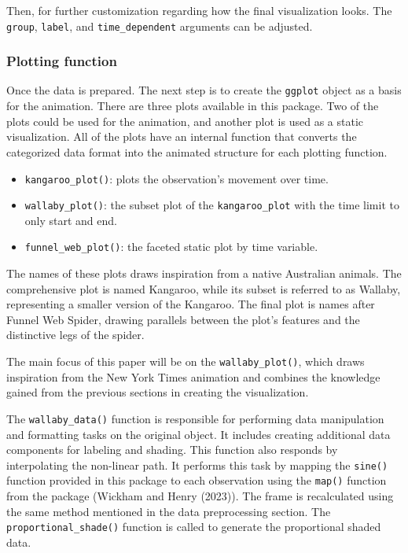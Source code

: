 Then, for further customization regarding how the final visualization looks. The \texttt{group}, \texttt{label}, and \texttt{time\_dependent} arguments can be adjusted.

\hypertarget{plotting-function}{%
\subsubsection{Plotting function}\label{plotting-function}}

Once the data is prepared. The next step is to create the \texttt{ggplot} object as a basis for the animation. There are three plots available in this package. Two of the plots could be used for the animation, and another plot is used as a static visualization. All of the plots have an internal function that converts the categorized data format into the animated structure for each plotting function.

\begin{itemize}
\tightlist
\item
  \texttt{kangaroo\_plot()}: plots the observation's movement over time.
\item
  \texttt{wallaby\_plot()}: the subset plot of the \texttt{kangaroo\_plot} with the time limit to only start and end.
\item
  \texttt{funnel\_web\_plot()}: the faceted static plot by time variable.
\end{itemize}

The names of these plots draws inspiration from a native Australian animals. The comprehensive plot is named Kangaroo, while its subset is referred to as Wallaby, representing a smaller version of the Kangaroo. The final plot is names after Funnel Web Spider, drawing parallels between the plot's features and the distinctive legs of the spider.

The main focus of this paper will be on the \texttt{wallaby\_plot()}, which draws inspiration from the New York Times animation and combines the knowledge gained from the previous sections in creating the visualization.

The \texttt{wallaby\_data()} function is responsible for performing data manipulation and formatting tasks on the original object. It includes creating additional data components for labeling and shading. This function also responds by interpolating the non-linear path. It performs this task by mapping the \texttt{sine()} function provided in this package to each observation using the \texttt{map()} function from the  package (Wickham and Henry (2023)). The frame is recalculated using the same method mentioned in the data preprocessing section. The \texttt{proportional\_shade()} function is called to generate the proportional shaded data.

